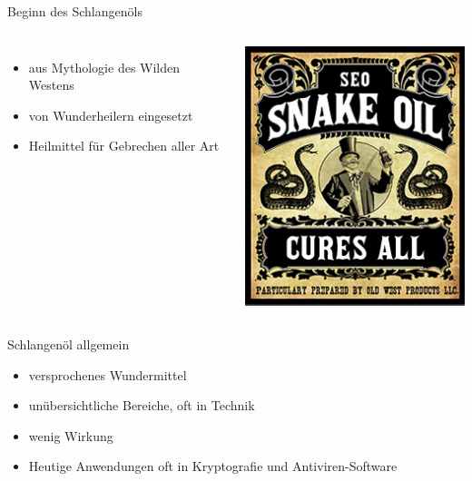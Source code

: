 \documentclass{beamer}
\begin{document}
	\begin{frame}{Beginn des Schlangenöls}
		\begin{columns}[T,onlytextwidth]
			\begin{itemize}
				\item aus Mythologie des Wilden Westens
				\item von Wunderheilern eingesetzt
				\item Heilmittel für Gebrechen aller Art
			\end{itemize}
			
				\includegraphics[width=1\textwidth]{Bilder/snakeoil.jpeg}

		\end{columns}
	\end{frame}
	
	\begin{frame}{Schlangenöl allgemein}
		\begin{itemize}
			\item versprochenes Wundermittel
			\item unübersichtliche Bereiche, oft in Technik
			\item \alert{wenig Wirkung}
			\item Heutige Anwendungen oft in Kryptografie und \alert{Antiviren-Software}
		\end{itemize}
	\end{frame}
	
\end{document}
